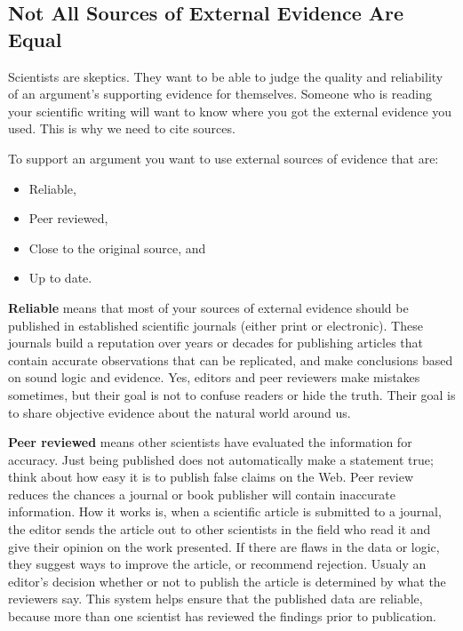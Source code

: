 \documentclass[
]{book}
\providecommand{\tightlist}{%
  \setlength{\itemsep}{0pt}\setlength{\parskip}{0pt}}
\begin{document}
\hypertarget{not-all-sources-of-external-evidence-are-equal}{%
\subsection{Not All Sources of External Evidence Are Equal}\label{not-all-sources-of-external-evidence-are-equal}}

Scientists are skeptics. They want to be able to judge the quality and reliability of an argument's supporting evidence for themselves. Someone who is reading your scientific writing will want to know where you got the external evidence you used. This is why we need to cite sources.

To support an argument you want to use external sources of evidence that are:

\begin{itemize}
\tightlist
\item
  Reliable,
\item
  Peer reviewed,
\item
  Close to the original source, and
\item
  Up to date.
\end{itemize}

\textbf{Reliable} means that most of your sources of external evidence should be published in established scientific journals (either print or electronic). These journals build a reputation over years or decades for publishing articles that contain accurate observations that can be replicated, and make conclusions based on sound logic and evidence. Yes, editors and peer reviewers make mistakes sometimes, but their goal is not to confuse readers or hide the truth. Their goal is to share objective evidence about the natural world around us.

\textbf{Peer reviewed} means other scientists have evaluated the information for accuracy. Just being published does not automatically make a statement true; think about how easy it is to publish false claims on the Web. Peer review reduces the chances a journal or book publisher will contain inaccurate information. How it works is, when a scientific article is submitted to a journal, the editor sends the article out to other scientists in the field who read it and give their opinion on the work presented. If there are flaws in the data or logic, they suggest ways to improve the article, or recommend rejection. Usualy an editor's decision whether or not to publish the article is determined by what the reviewers say. This system helps ensure that the published data are reliable, because more than one scientist has reviewed the findings prior to publication.
\end{document}
